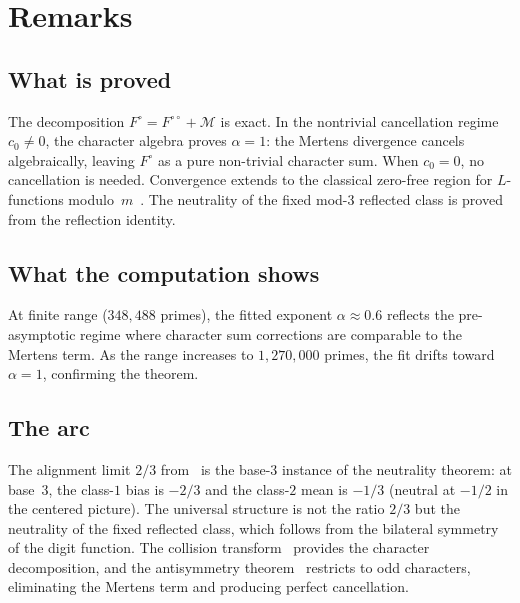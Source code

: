 \documentclass[12pt]{amsart}
\theoremstyle{definition}
\theoremstyle{remark}
\begin{document}
\section{Remarks}

\subsection*{What is proved}

The decomposition
$F^{\circ} = F^{\circ\circ} + \mathcal{M}$ is exact.
In the nontrivial cancellation regime $c_0 \ne 0$, the
character algebra proves $\alpha = 1$: the Mertens
divergence cancels algebraically, leaving $F^{\circ}$
as a pure non-trivial character sum. When $c_0 = 0$,
no cancellation is needed. Convergence
extends to the classical zero-free region for
$L$-functions modulo~$m$~\cite{davenport}. The
neutrality of the fixed mod-$3$ reflected class is
proved from the reflection identity.

\subsection*{What the computation shows}

At finite range ($348{,}488$ primes), the fitted
exponent $\alpha \approx 0.6$ reflects the
pre-asymptotic regime where character sum corrections
are comparable to the Mertens term. As the range
increases to $1{,}270{,}000$ primes, the fit drifts
toward $\alpha = 1$, confirming the theorem.

\subsection*{The arc}

The alignment limit $2/3$ from~\cite{paper1} is the
base-$3$ instance of the neutrality theorem: at base~$3$,
the class-$1$ bias is $-2/3$ and the class-$2$ mean is
$-1/3$ (neutral at $-1/2$ in the centered picture). The
universal structure is not the ratio $2/3$ but the
neutrality of the fixed reflected class, which follows
from the bilateral symmetry of the digit function. The collision
transform~\cite{paper16} provides the character
decomposition, and the antisymmetry
theorem~\cite{paper17} restricts to odd characters,
eliminating the Mertens term and producing perfect
cancellation.
\end{document}
